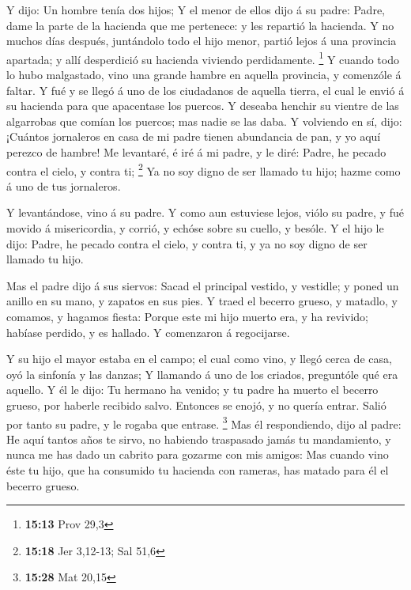  Y dijo: Un hombre tenía dos hijos;  Y el
menor de ellos dijo á su padre: Padre, dame la parte de la hacienda que
me pertenece: y les repartió la hacienda.  Y no muchos
días después, juntándolo todo el hijo menor, partió lejos á una
provincia apartada; y allí desperdició su hacienda viviendo
perdidamente. \footnote{\textbf{15:13} Prov 29,3}  Y
cuando todo lo hubo malgastado, vino una grande hambre en aquella
provincia, y comenzóle á faltar.  Y fué y se llegó á uno
de los ciudadanos de aquella tierra, el cual le envió á su hacienda para
que apacentase los puercos.  Y deseaba henchir su vientre
de las algarrobas que comían los puercos; mas nadie se las daba.
 Y volviendo en sí, dijo: ¡Cuántos jornaleros en casa de
mi padre tienen abundancia de pan, y yo aquí perezco de hambre!
 Me levantaré, é iré á mi padre, y le diré: Padre, he
pecado contra el cielo, y contra ti; \footnote{\textbf{15:18} Jer
  3,12-13; Sal 51,6}  Ya no soy digno de ser llamado tu
hijo; hazme como á uno de tus jornaleros.

 Y levantándose, vino á su padre. Y como aun estuviese
lejos, viólo su padre, y fué movido á misericordia, y corrió, y echóse
sobre su cuello, y besóle.  Y el hijo le dijo: Padre, he
pecado contra el cielo, y contra ti, y ya no soy digno de ser llamado tu
hijo.

 Mas el padre dijo á sus siervos: Sacad el principal
vestido, y vestidle; y poned un anillo en su mano, y zapatos en sus
pies.  Y traed el becerro grueso, y matadlo, y comamos, y
hagamos fiesta:  Porque este mi hijo muerto era, y ha
revivido; habíase perdido, y es hallado. Y comenzaron á regocijarse.

 Y su hijo el mayor estaba en el campo; el cual como
vino, y llegó cerca de casa, oyó la sinfonía y las danzas;
 Y llamando á uno de los criados, preguntóle qué era
aquello.  Y él le dijo: Tu hermano ha venido; y tu padre
ha muerto el becerro grueso, por haberle recibido salvo. 
Entonces se enojó, y no quería entrar. Salió por tanto su padre, y le
rogaba que entrase. \footnote{\textbf{15:28} Mat 20,15} 
Mas él respondiendo, dijo al padre: He aquí tantos años te sirvo, no
habiendo traspasado jamás tu mandamiento, y nunca me has dado un cabrito
para gozarme con mis amigos:  Mas cuando vino éste tu
hijo, que ha consumido tu hacienda con rameras, has matado para él el
becerro grueso.

